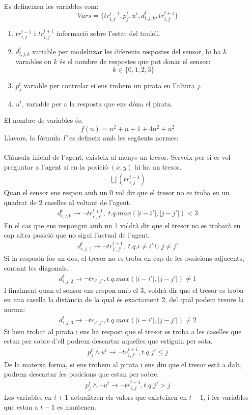 
Es defineixen les variables com:
\[
Vars = \{tr^{t-1}_{i,j},   p_j^t, u^t, d_{i, j, k}^t, tr^{t+1}_{i,j}\}
\]
\begin{enumerate}
	\item $tr^{t-1}_{i,j}$ i $tr^{t+1}_{i,j}$ informació sobre l'estat del taulell. 
	\item $d_{i, j, k}^t$ variable per modelitzar les diferents respostes del sensor, hi ha $k$ variables on $k$ és el nombre de respostes que pot donar el sensor: \[k \in \{0,1,2,3\}\]
	\item $p_j^t$ variable per controlar si ens trobem un pirata en l'altura $j$.
	\item $u^t$, variable per a la resposta que ens dóna el pirata.
\end{enumerate}
El nombre de variables és:
\[
f(n) = n^2 + n + 1 + 4n^2 + n^2
\]
Llavors, la fórmula $\Gamma$ es defineix amb les següents normes:\\
\\
Clàusula inicial de l'agent, existeix al menys un tresor. Serveix per si es vol preguntar a l'agent si en la posició
$(x, y)$ hi ha un tresor. 
\begin{gather}
\bigcup(tr_{i, j}^{t-1})
\end{gather}
Quan el sensor ens respon amb un 0 vol dir que el tresor no es troba en un quadrat de 2 caselles al voltant de l'agent.
\begin{gather}
d_{i, j, 0}^t \rightarrow \neg tr_{i', j'}^{t+1},\; t.q. max(|i - i'|, |j - j'|) < 3
\end{gather}
En el cas que ens respongui amb un 1 voldrà dir que el tresor no es trobarà en cap altra posició que no sigui l'actual de l'agent.
\begin{gather}
d_{i, j, 1}^t \rightarrow \neg tr_{i', j'}^{t+1},\; t.q. i \neq i' \cup j \neq j'
\end{gather}
Si la resposta fos un dos, el tresor no es troba en cap de les posicions adjacents, contant les diagonals.
\begin{gather}
d_{i, j, 2}^t \rightarrow \neg tr_{i', j'}, t.q. max(|i - i'|, |j - j'|) \neq 1
\end{gather}
I finalment quan el sensor ens respon amb el 3, voldrà dir que el tresor es troba en una casella la distància de la qual
és exactament 2, del qual podem treure la norma:
\begin{gather}
d_{i, j, 3}^t \rightarrow \neg tr_{i', j'}, t.q. max(|i - i'|, |j - j'|) \neq 2
\end{gather}
Si hem trobat al pirata i ens ha respost que el tresor es troba a les caselles que estan per sobre d'ell podrem
 descartar aquelles que estiguin per sota.
\begin{gather}
p_j^t \wedge u^t \rightarrow \neg tr_{i, j'}^{t+1}, t.q. j' \leq j
\end{gather}
De la mateixa forma, si ens trobem al pirata i ens diu que el tresor està a dalt, podrem descartar les posicions que
estan per sobre.
\begin{gather}
p_j^t \wedge \neg u^t \rightarrow \neg tr_{i, j'}^{t+1}, t.q. j' > j
\end{gather}
Les variables en $t + 1$ actualitzen els valors que existeixen en $t - 1$, i les variables que estan a $t-1$ es mantenen.
